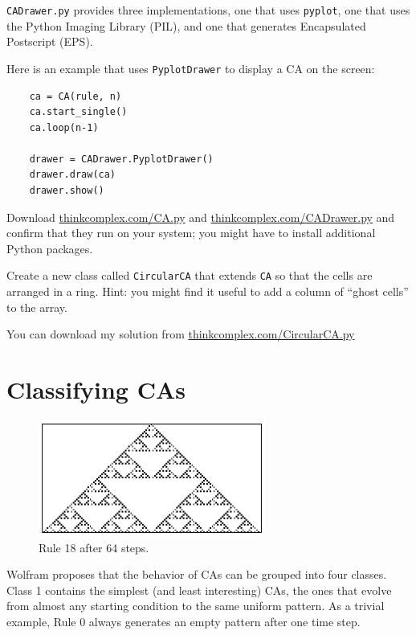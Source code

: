 \documentclass[10pt]{book}
\begin{document}
{\tt CADrawer.py} provides three implementations, one that uses
{\tt pyplot}, one that uses the Python Imaging Library (PIL), and
one that generates Encapsulated Postscript (EPS).

Here is an example that uses {\tt PyplotDrawer} to display a
CA on the screen:

\begin{verbatim}
    ca = CA(rule, n)
    ca.start_single()
    ca.loop(n-1)

    drawer = CADrawer.PyplotDrawer()
    drawer.draw(ca)
    drawer.show()
\end{verbatim}

\begin{exercise}

Download \url{thinkcomplex.com/CA.py} and \url{thinkcomplex.com/CADrawer.py}
and confirm that they run on your system; you might have to install
additional Python packages.

Create a new class called {\tt CircularCA} that extends
{\tt CA} so that the cells are arranged in a ring.
Hint: you might find it useful to add a column of ``ghost cells'' to
the array.

You can download my solution from
\url{thinkcomplex.com/CircularCA.py}

\end{exercise}


\section{Classifying CAs}

\begin{figure}
\centerline{\includegraphics[height=1.5in]{figs/rule-18-64.pdf}}
\caption{Rule 18 after 64 steps.\label{fig.rule18}}
\end{figure}

Wolfram proposes that the behavior of CAs can be grouped
into four classes.  Class 1 contains the simplest (and least
interesting) CAs, the ones that evolve from almost any starting
condition to the same uniform pattern.  As a trivial example,
Rule 0 always generates an empty pattern after one time step.
\end{document}
